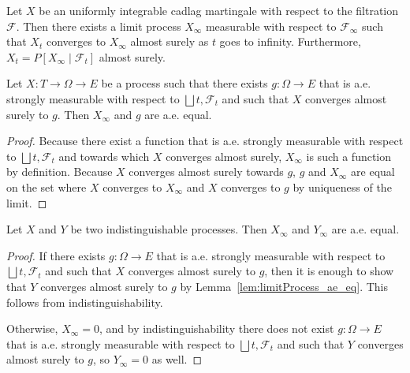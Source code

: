 \begin{theorem}\label{thm:tendsto_limitProcess_of_cadlag}
  \leanok
Let $X$ be an uniformly integrable cadlag martingale with respect to the filtration $\mathcal{F}$.
Then there exists a limit process $X_\infty$ measurable with respect to $\mathcal{F}_\infty$ such that $X_t$ converges to $X_\infty$ almost surely as $t$ goes to infinity.
Furthermore, $X_t = P[X_\infty \mid \mathcal{F}_t]$ almost surely.
\end{theorem}

\begin{lemma}\label{lem:limitProcess_ae_eq}
  \leanok
Let $X : T \to \Omega \to E$ be a process such that there exists $g : \Omega \to E$ that is a.e. strongly measurable with respect to $\bigsqcup t, \mathcal{F}_t$ and such that $X$ converges almost surely to $g$. Then $X_\infty$ and $g$ are a.e. equal.
\end{lemma}

\begin{proof}
  Because there exist a function that is a.e. strongly measurable with respect to $\bigsqcup t, \mathcal{F}_t$ and towards which $X$ converges almost surely, $X_\infty$ is such a function by definition. Because $X$ converges almost surely towards $g$, $g$ and $X_\infty$ are equal on the set where $X$ converges to $X_\infty$ and $X$ converges to $g$ by uniqueness of the limit.
\end{proof}

\begin{lemma}\label{lem:limitProcess_congr}
  \leanok
  Let $X$ and $Y$ be two indistinguishable processes. Then $X_\infty$ and $Y_\infty$ are a.e. equal.
\end{lemma}

\begin{proof}
  If there exists $g : \Omega \to E$ that is a.e. strongly measurable with respect to $\bigsqcup t, \mathcal{F}_t$ and such that $X$ converges almost surely to $g$, then it is enough to show that $Y$ converges almost surely to $g$ by Lemma~\ref{lem:limitProcess_ae_eq}. This follows from indistinguishability.

  Otherwise, $X_\infty = 0$, and by indistinguishability there does not exist $g : \Omega \to E$ that is a.e. strongly measurable with respect to $\bigsqcup t, \mathcal{F}_t$ and such that $Y$ converges almost surely to $g$, so $Y_\infty = 0$ as well.
\end{proof}

